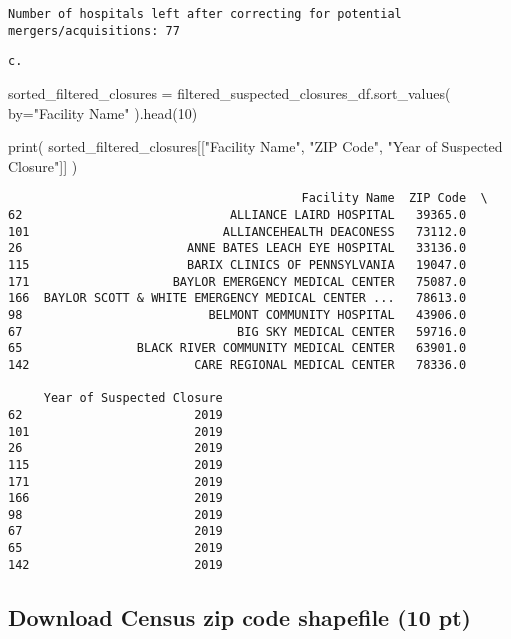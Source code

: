 \documentclass[
  letterpaper,
  DIV=11,
  numbers=noendperiod]{scrartcl}
\newenvironment{Shaded}{\begin{snugshade}}{\end{snugshade}}
\newcommand{\BuiltInTok}[1]{\textcolor[rgb]{0.00,0.23,0.31}{#1}}
\newcommand{\DecValTok}[1]{\textcolor[rgb]{0.68,0.00,0.00}{#1}}
\newcommand{\NormalTok}[1]{\textcolor[rgb]{0.00,0.23,0.31}{#1}}
\newcommand{\OperatorTok}[1]{\textcolor[rgb]{0.37,0.37,0.37}{#1}}
\newcommand{\StringTok}[1]{\textcolor[rgb]{0.13,0.47,0.30}{#1}}
\begin{document}
\begin{verbatim}
Number of hospitals left after correcting for potential mergers/acquisitions: 77
\end{verbatim}

\begin{verbatim}
c.
\end{verbatim}

\begin{Shaded}
\begin{Highlighting}[]
\NormalTok{sorted\_filtered\_closures }\OperatorTok{=}\NormalTok{ filtered\_suspected\_closures\_df.sort\_values(}
\NormalTok{    by}\OperatorTok{=}\StringTok{"Facility Name"}
\NormalTok{).head(}\DecValTok{10}\NormalTok{)}

\BuiltInTok{print}\NormalTok{(}
\NormalTok{    sorted\_filtered\_closures[[}\StringTok{"Facility Name"}\NormalTok{, }\StringTok{"ZIP Code"}\NormalTok{, }\StringTok{"Year of Suspected Closure"}\NormalTok{]]}
\NormalTok{)}
\end{Highlighting}
\end{Shaded}

\begin{verbatim}
                                         Facility Name  ZIP Code  \
62                             ALLIANCE LAIRD HOSPITAL   39365.0   
101                           ALLIANCEHEALTH DEACONESS   73112.0   
26                       ANNE BATES LEACH EYE HOSPITAL   33136.0   
115                      BARIX CLINICS OF PENNSYLVANIA   19047.0   
171                    BAYLOR EMERGENCY MEDICAL CENTER   75087.0   
166  BAYLOR SCOTT & WHITE EMERGENCY MEDICAL CENTER ...   78613.0   
98                          BELMONT COMMUNITY HOSPITAL   43906.0   
67                              BIG SKY MEDICAL CENTER   59716.0   
65                BLACK RIVER COMMUNITY MEDICAL CENTER   63901.0   
142                       CARE REGIONAL MEDICAL CENTER   78336.0   

     Year of Suspected Closure  
62                        2019  
101                       2019  
26                        2019  
115                       2019  
171                       2019  
166                       2019  
98                        2019  
67                        2019  
65                        2019  
142                       2019  
\end{verbatim}

\subsection{Download Census zip code shapefile (10
pt)}\label{download-census-zip-code-shapefile-10-pt}
\end{document}
